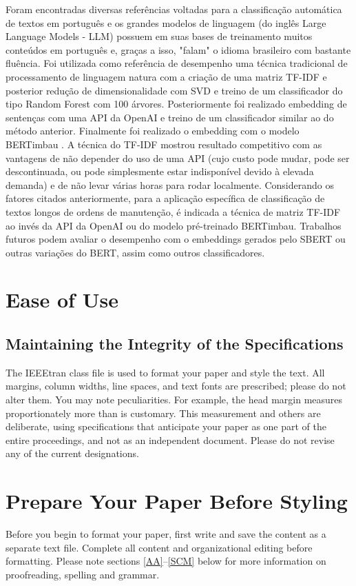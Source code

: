 \documentclass[conference]{IEEEtran}
\begin{document}
  Foram encontradas diversas referências voltadas para a classificação automática de textos em português e os grandes modelos de linguagem (do inglês Large Language Models - LLM) possuem em suas bases de treinamento muitos conteúdos em português e, graças a isso, "falam" o idioma brasileiro com bastante fluência.
  Foi utilizada como referência de desempenho uma técnica tradicional de processamento de linguagem natura com a criação de uma matriz TF-IDF e posterior redução de dimensionalidade com SVD e treino de um classificador do tipo Random Forest com 100 árvores. Posteriormente foi realizado embedding de sentenças com uma API da OpenAI e treino de um classificador similar ao do método anterior. Finalmente foi realizado o embedding com o modelo BERTimbau \cite{souza2020bertimbau}. A técnica do TF-IDF mostrou resultado competitivo com as vantagens de não depender do uso de uma API (cujo custo pode mudar, pode ser descontinuada, ou pode simplesmente estar indisponível devido à elevada demanda) e de não levar várias horas para rodar localmente.
  Considerando os fatores citados anteriormente, para a aplicação específica de classificação de textos longos de ordens de manutenção, é indicada a técnica de matriz TF-IDF ao invés da API da OpenAI ou do modelo pré-treinado BERTimbau.
  Trabalhos futuros podem avaliar o desempenho com o embeddings gerados pelo SBERT \cite{reimers-2019-sentence-bert} ou outras variações do BERT, assim como outros classificadores.

  
\section{Ease of Use}

\subsection{Maintaining the Integrity of the Specifications}

The IEEEtran class file is used to format your paper and style the text. All margins, 
column widths, line spaces, and text fonts are prescribed; please do not 
alter them. You may note peculiarities. For example, the head margin
measures proportionately more than is customary. This measurement 
and others are deliberate, using specifications that anticipate your paper 
as one part of the entire proceedings, and not as an independent document. 
Please do not revise any of the current designations.

\section{Prepare Your Paper Before Styling}
Before you begin to format your paper, first write and save the content as a 
separate text file. Complete all content and organizational editing before 
formatting. Please note sections \ref{AA}--\ref{SCM} below for more information on 
proofreading, spelling and grammar.
\end{document}
